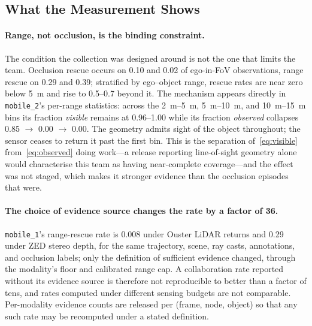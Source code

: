 \subsection{What the Measurement Shows}
\label{sec:findings}

\paragraph{Range, not occlusion, is the binding constraint.}
The condition the collection was designed around is not the one that limits the
team. Occlusion rescue occurs on 0.10 and 0.02 of ego-in-FoV observations,
range rescue on 0.29 and 0.39; stratified by ego--object range, rescue rates are
near zero below \SI{5}{\metre} and rise to \numrange{0.5}{0.7} beyond it. The
mechanism appears directly in \texttt{mobile\_2}'s per-range statistics: across
the \SIrange{2}{5}{\metre}, \SIrange{5}{10}{\metre}, and
\SIrange{10}{15}{\metre} bins its fraction \textit{visible} remains at
\numrange{0.96}{1.00} while its fraction \textit{observed} collapses
\num{0.85} $\rightarrow$ \num{0.00} $\rightarrow$ \num{0.00}. The geometry
admits sight of the object throughout; the sensor ceases to return it past the
first bin. This is the separation of~\eqref{eq:visible}
from~\eqref{eq:observed} doing work---a release reporting line-of-sight geometry
alone would characterise this team as having near-complete coverage---and the
effect was not staged, which makes it stronger evidence than the occlusion
episodes that were.

\paragraph{The choice of evidence source changes the rate by a factor of 36.}
\texttt{mobile\_1}'s range-rescue rate is \num{0.008} under Ouster LiDAR returns
and \num{0.29} under ZED stereo depth, for the same trajectory, scene, ray
casts, annotations, and occlusion labels; only the definition of sufficient
evidence changed, through the modality's floor and calibrated range cap. A
collaboration rate reported without its evidence source is therefore not
reproducible to better than a factor of tens, and rates computed under different
sensing budgets are not comparable. Per-modality evidence counts are released
per (frame, node, object) so that any such rate may be recomputed under a stated
definition.


